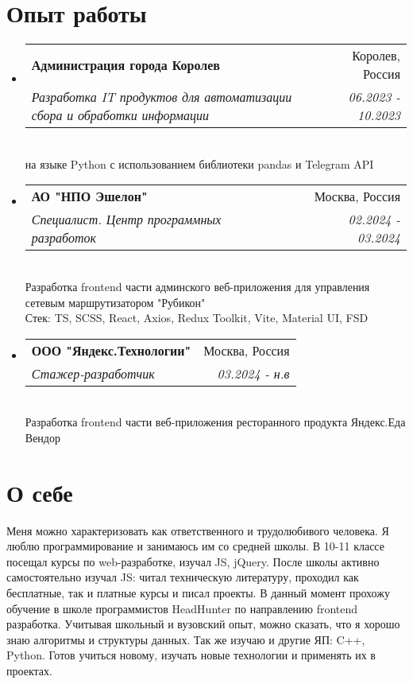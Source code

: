 \documentclass[letterpaper,10pt]{article}
\makeatletter
\newcommand{\resumeSubheading}[4]{
  \vspace{-1pt}\item
    \begin{tabular*}{0.97\textwidth}{l@{\extracolsep{\fill}}r}
      \textbf{#1} & \textcolor{mygray}{#2} \\
      \textit{\small#3} & \textcolor{mygray}{\textit{\small #4}} \\
    \end{tabular*}\vspace{-5pt}
}
\newcommand{\resumeSubHeadingListStart}{\begin{itemize}[leftmargin=*]}
\newcommand{\resumeSubHeadingListEnd}{\end{itemize}}
\makeatother
\begin{document}
\section{Опыт работы}
  \resumeSubHeadingListStart
    \resumeSubheading
       {Администрация города Королев}{Королев, Россия}
      {Разработка IT продуктов для автоматизации сбора и обработки информации }{06.2023 - 10.2023}
      \\ \vspace{4pt}
      {на языке Python с использованием библиотеки pandas и Telegram API}
      \\ \vspace{4pt}
  \resumeSubHeadingListEnd
   \resumeSubHeadingListStart
    \resumeSubheading
       {АО "НПО Эшелон"}{Москва, Россия}
      {Специалист. Центр программных разработок}{02.2024 - 03.2024}
      \\ \vspace{4pt}
      {Разработка frontend части админского веб-приложения для управления }
      \\ \vspace{0pt}
      {сетевым маршрутизатором "Рубикон"}
      \\ \vspace{1pt}
      {Стек: TS, SCSS, React, Axios, Redux Toolkit, Vite, Material UI, FSD}
      \\ \vspace{4pt}
  \resumeSubHeadingListEnd
   \resumeSubHeadingListStart
    \resumeSubheading
       {ООО "Яндекс.Технологии"}{Москва, Россия}
      {Стажер-разработчик }{03.2024 - н.в}
      \\ \vspace{4pt}
      {Разработка frontend части веб-приложения ресторанного продукта Яндекс.Еда Вендор}
      \\ \vspace{4pt}
  \resumeSubHeadingListEnd

\section{О себе}
    Меня можно характеризовать как ответственного и трудолюбивого человека. Я люблю программирование и занимаюсь им со средней школы. В 10-11 классе посещал курсы по web-разработке, изучал JS, jQuery. После школы активно самостоятельно изучал JS: читал техническую литературу, проходил как бесплатные, так и платные курсы и писал проекты. В данный момент прохожу обучение в школе программистов HeadHunter по направлению frontend разработка. Учитывая школьный и вузовский опыт, можно сказать, что я хорошо знаю алгоритмы и структуры данных. Так же изучаю и другие ЯП: C++, Python. Готов учиться новому, изучать новые технологии и применять их в проектах.
\end{document}
